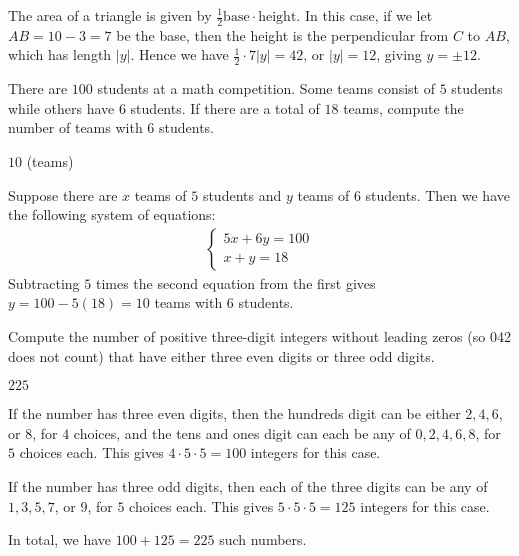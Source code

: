 \documentclass[11pt]{article}
\begin{document}
\begin{solution}
The area of a triangle is given by $\frac{1}{2} \text{base} \cdot \text{height}$.
In this case, if we let $AB = 10-3 = 7$ be the base, then the height is the perpendicular
from $C$ to $AB$, which has length $|y|$. Hence we have $\frac{1}{2}\cdot 7|y| = 42$,
or $|y| = 12$, giving $y = \boxed{\pm 12}$.
\end{solution}


\begin{problem}
There are $100$ students at a math competition. Some teams consist of $5$ students while others have $6$
students. If there are a total of $18$ teams, compute the number of teams with $6$ students.
\end{problem}

\begin{answer}
$\boxed{10}$ (teams)
\end{answer}

\begin{solution}
Suppose there are $x$ teams of $5$ students and $y$ teams of $6$ students. Then we have the
following system of equations:
\begin{align*}
\begin{cases}
5x + 6y = 100 \\
x + y = 18
\end{cases}
\end{align*}
Subtracting $5$ times the second equation from the first gives $y = 100 -  5(18) = \boxed{10}$ 
teams with $6$ students.
\end{solution}


\begin{problem}%
Compute the number of positive three-digit integers without leading zeros (so 042 does not count) that
have either three even digits or three odd digits.
\end{problem}

\begin{answer}
$\boxed{225}$
\end{answer}

\begin{solution}
If the number has three even digits, then the hundreds digit can be either $2, 4, 6$, or $8$, for $4$ choices,
and the tens and ones digit can each be any of $0, 2, 4, 6, 8$, for $5$ choices each.
This gives $4 \cdot 5 \cdot 5 = 100$ integers for this case. \newline

If the number has three odd digits, then each of the three digits can be any of $1, 3, 5, 7$, or $9$, for
$5$ choices each. This gives $5 \cdot 5 \cdot 5 = 125$ integers for this case. \newline

In total, we have $100 + 125 = \boxed{225}$ such numbers.
\end{solution}
\end{document}
